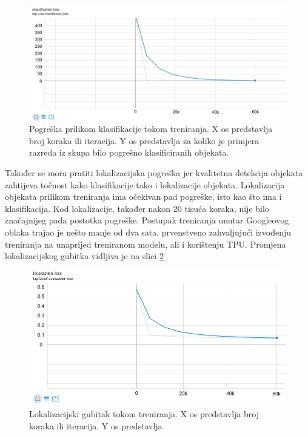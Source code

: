 \begin{figure}[htb]
    \centering
    \includegraphics[width=12cm]{img/class-loss.png}
    \caption{Pogreška prilikom klasifikacije tokom treniranja. X os predstavlja broj koraka ili iteracija. Y os predstavlja 
    za koliko je primjera razreda iz skupa bilo pogrešno klasificiranih objekata.}
    \label{Class-Loss}
\end{figure}


Također se mora pratiti lokalizacijska pogreška jer kvalitetna detekcija objekata zahtijeva točnost kako klasifikacije
tako i lokalizacije objekata.
Lokalizacija objekata prilikom treniranja ima očekivan pad pogreške, isto kao što ima i klasifikacija. Kod lokalizacije, također nakon 20 tisuća koraka, nije bilo značajnijeg pada postotka pogreške. 
Postupak treniranja unutar Googleovog oblaka trajao je nešto manje od dva sata, prvenstveno zahvaljujući izvođenju treniranja na unaprijed treniranom modelu, ali i korištenju TPU. Promjena lokalizacijskog gubitka vidljiva je na slici \ref{Local-Loss} 

\begin{figure}[htb]
    \centering
    \includegraphics[width=12cm]{img/local-loss.png}
    \caption{Lokalizacijski gubitak tokom treniranja. X os predstavlja broj koraka ili iteracija. Y os predstavlja }
    \label{Local-Loss}
\end{figure}

